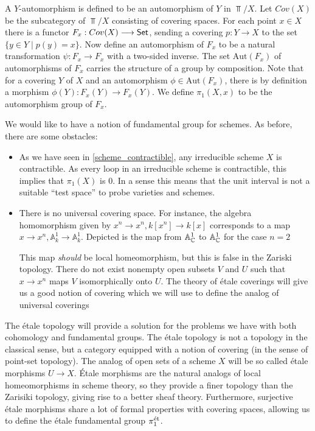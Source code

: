 A $Y$-automorphism is defined to be an automorphism of $Y$ in $\Top/X$. Let $Cov(X)$ be the subcategory of $\Top/X$ consisting of covering spaces. For each point $x \in X$ there is a functor $F_x: Cov(X) \longrightarrow \mathsf{Set}$, sending a covering $p: Y \to X$ to the set $\{y \in Y \mid p(y) = x\}$. Now define an automorphism of $F_x$ to be a natural transformation $\psi: F_x \to F_x$ with a two-sided inverse. The set $\text{Aut}(F_x)$ of automorphisms of $F_x$ carries the structure of a group by composition. Note that for a covering $Y$ of $X$ and an automorphism $\phi \in \text{Aut}(F_x)$, there is by definition a morphism $\phi(Y): F_x(Y) \to F_x(Y)$. We define $\pi_1(X,x)$ to be the automorphism group of $F_x$.

We would like to have a notion of fundamental group for schemes. As before, there are some obstacles:

\begin{itemize}
  \item  As we have seen in \ref{scheme_contractible}, any irreducible scheme $X$ is contractible. As every loop in an irreducible scheme is contractible, this implies that $\pi_1(X)$ is $0$. In a sense this means that the unit interval is not a suitable ``test space'' to probe varieties and schemes.
  \item There is no universal covering space.
        For instance, the algebra homomorphism given by $x^n \to x^n, k[x^n] \to k[x]$ corresponds to a map $x \to x^n, \mathbb{A}^1_k \to \mathbb{A}^1_k$. Depicted is the map from $\mathbb{A}^1_{\mathbb{C}}$ to $\mathbb{A}^1_{\mathbb{C}}$ for the case $n=2$

        
        This map \textit{should} be local homeomorphism, but this is false in the Zariski topology. There do not exist nonempty open subsets $V$ and $U$ such that $x \to x^n$ maps $V$ isomorphically onto $U$. The theory of \'etale coverings will give us a good notion of covering which we will use to define the analog of universal coverings
\end{itemize}

The \'etale topology will provide a solution for the problems we have with both cohomology and fundamental groups. The \'etale topology is not a topology in the classical sense, but a category equipped with a notion of covering (in the sense of point-set topology). The analog of open sets of a scheme $X$ will be so called \'etale morphisms $U \to X$. \'Etale morphisms are the natural analogs of local homeomorphisms in scheme theory, so they provide a finer topology than the Zarisiki topology, giving rise to a better sheaf theory. Furthermore, surjective \'etale morphisms share a lot of formal properties with covering spaces, allowing us to define the \'etale fundamental group $\pi_1^{\text{\'et}}$.

